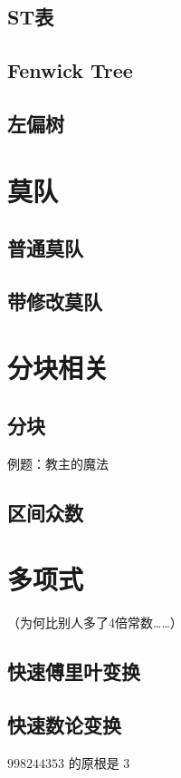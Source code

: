 \documentclass{article}
\begin{document}
		\subsection{ST表}
		
		\subsection{Fenwick Tree}
		
		\subsection{左偏树}
		
	\newpage

	\section{莫队}
		\subsection{普通莫队}
		
		\subsection{带修改莫队}
		
	\newpage

	\section{分块相关}
		\subsection{分块}
		例题：教主的魔法
		
		\subsection{区间众数}
		
	\newpage
	\section{多项式}
		（为何比别人多了4倍常数……）
		\subsection{快速傅里叶变换}
		
		\subsection{快速数论变换}
		$998244353$ 的原根是 $3$
		
\end{document}
